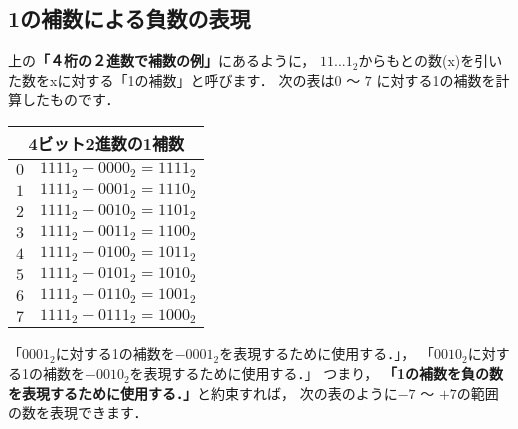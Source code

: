 \subsection{1の補数による負数の表現}

上の{\bf「４桁の２進数で補数の例」}にあるように，
$11...1_2$からもとの数(x)を引いた数をxに対する「1の補数」と呼びます．
次の表は$0$ 〜 $7$ に対する1の補数を計算したものです．

\begin{center}
\begin{tabular}{ | l | l |}
\hline
\multicolumn{2}{|c|}{\bf 4ビット2進数の1補数} \\
\hline
$0$  & $1111_2 - 0000_2 = 1111_2$ \\
$1$  & $1111_2 - 0001_2 = 1110_2$ \\
$2$  & $1111_2 - 0010_2 = 1101_2$ \\
$3$  & $1111_2 - 0011_2 = 1100_2$ \\
$4$  & $1111_2 - 0100_2 = 1011_2$ \\
$5$  & $1111_2 - 0101_2 = 1010_2$ \\
$6$  & $1111_2 - 0110_2 = 1001_2$ \\
$7$  & $1111_2 - 0111_2 = 1000_2$ \\
\hline
\end{tabular}
\end{center}

「$0001_2$に対する1の補数を$-0001_2$を表現するために使用する．」，
「$0010_2$に対する1の補数を$-0010_2$を表現するために使用する．」
つまり，
{\bf 「1の補数を負の数を表現するために使用する．」}と約束すれば，
次の表のように$-7$ 〜 $+7$の範囲の数を表現できます．

